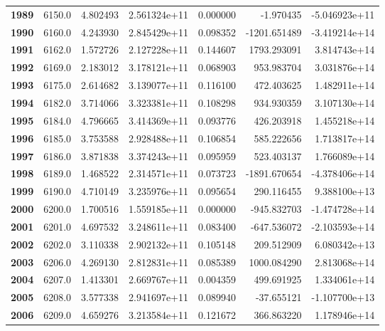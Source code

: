 \documentclass{report}[12pt]
\begin{document}
\begin{center}
\begin{tabular}{lrrrrrr}
\textbf{1989} &         6150.0 &   4.802493 &  2.561324e+11 &    0.000000 &    -1.970435 & -5.046923e+11 \\
\textbf{1990} &         6160.0 &   4.243930 &  2.845429e+11 &    0.098352 & -1201.651489 & -3.419214e+14 \\
\textbf{1991} &         6162.0 &   1.572726 &  2.127228e+11 &    0.144607 &  1793.293091 &  3.814743e+14 \\
\textbf{1992} &         6169.0 &   2.183012 &  3.178121e+11 &    0.068903 &   953.983704 &  3.031876e+14 \\
\textbf{1993} &         6175.0 &   2.614682 &  3.139077e+11 &    0.116100 &   472.403625 &  1.482911e+14 \\
\textbf{1994} &         6182.0 &   3.714066 &  3.323381e+11 &    0.108298 &   934.930359 &  3.107130e+14 \\
\textbf{1995} &         6184.0 &   4.796665 &  3.414369e+11 &    0.093776 &   426.203918 &  1.455218e+14 \\
\textbf{1996} &         6185.0 &   3.753588 &  2.928488e+11 &    0.106854 &   585.222656 &  1.713817e+14 \\
\textbf{1997} &         6186.0 &   3.871838 &  3.374243e+11 &    0.095959 &   523.403137 &  1.766089e+14 \\
\textbf{1998} &         6189.0 &   1.468522 &  2.314571e+11 &    0.073723 & -1891.670654 & -4.378406e+14 \\
\textbf{1999} &         6190.0 &   4.710149 &  3.235976e+11 &    0.095654 &   290.116455 &  9.388100e+13 \\
\textbf{2000} &         6200.0 &   1.700516 &  1.559185e+11 &    0.000000 &  -945.832703 & -1.474728e+14 \\
\textbf{2001} &         6201.0 &   4.697532 &  3.248611e+11 &    0.083400 &  -647.536072 & -2.103593e+14 \\
\textbf{2002} &         6202.0 &   3.110338 &  2.902132e+11 &    0.105148 &   209.512909 &  6.080342e+13 \\
\textbf{2003} &         6206.0 &   4.269130 &  2.812831e+11 &    0.085389 &  1000.084290 &  2.813068e+14 \\
\textbf{2004} &         6207.0 &   1.413301 &  2.669767e+11 &    0.004359 &   499.691925 &  1.334061e+14 \\
\textbf{2005} &         6208.0 &   3.577338 &  2.941697e+11 &    0.089940 &   -37.655121 & -1.107700e+13 \\
\textbf{2006} &         6209.0 &   4.659276 &  3.213584e+11 &    0.121672 &   366.863220 &  1.178946e+14 \\

\end{tabular}
\end{center}
\end{document}

